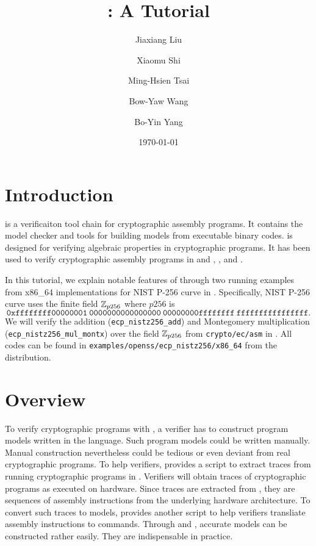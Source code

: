 \documentclass{amsproc}
\begin{document}
\title{\cryptoline: A Tutorial}
\author{Jiaxiang Liu}
\author{Xiaomu Shi}
\author{Ming-Hsien Tsai}
\author{Bow-Yaw Wang}
\author{Bo-Yin Yang}
\date{\today}
\maketitle

\section{Introduction}

\cryptoline is a verificaiton tool chain for cryptographic assembly
programs. It contains the \cryptoline model checker and tools for
building models from executable binary codes. \cryptoline is designed
for verifying algebraic properties in cryptographic programs. It has
been used to verify cryptographic assembly programs in \openssl and
\blst, \pqclean, and \pqmfour.

In this tutorial, we explain notable features of \cryptoline through
two running examples from x86\_64 implementations for NIST P-256 curve
in \openssl. Specifically, NIST P-256 curve uses the finite field
$\mathbb{Z}_{p256}$ where $p256$ is
\[
\mathtt{0xffffffff00000001\ 0000000000000000\ 00000000ffffffff\ 
   ffffffffffffffff}.
\]
We will verify the addition (\texttt{ecp\_nistz256\_add})
and Montegomery multiplication (\texttt{ecp\_nistz256\_mul\_montx})
over the field $\mathbb{Z}_{p256}$ from \texttt{crypto/ec/asm} in \openssl.
All \cryptoline codes can be found in
\texttt{examples/openss/ecp\_nistz256/x86\_64} from the \cryptoline
distribution. 

\section{\cryptoline Overview}

To verify cryptographic programs with \cryptoline, a verifier has to
construct program models written in the \cryptoline language. Such
program models could be written manually. Manual construction
nevertheless could be tedious or even deviant from real cryptographic
programs. To help verifiers, \cryptoline provides a \python script
\itrace to extract traces from running cryptographic
programs in \gdb. Verifiers will obtain traces of cryptographic 
programs as executed on hardware. Since traces are extracted from
\gdb, they are sequences of assembly instructions from the underlying
hardware architecture. To convert such traces to \cryptoline models,
\cryptoline provides another \python script \tozdsl to
help verifiers transliate assembly instructions to \cryptoline
commands. Through \itrace and \tozdsl, accurate \cryptoline models can
be constructed rather easily. They are indispensable in practice.
\end{document}
